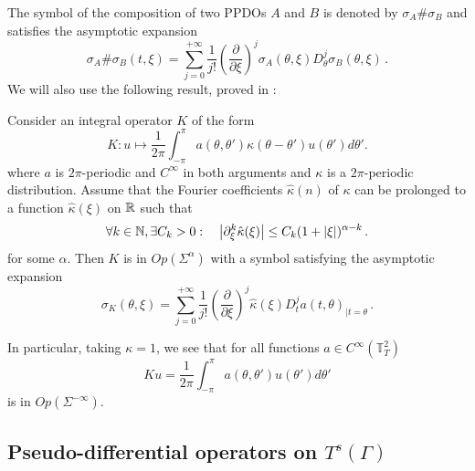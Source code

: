 \documentclass[a4paper]{article}
\begin{document}
The symbol of the composition of two PPDOs $A$ and $B$ is denoted by $\sigma_A \# \sigma_B$ and satisfies the asymptotic expansion
\begin{equation}
	\label{a_diese_b}
	\sigma_A \# \sigma_B(t,\xi) = \sum_{j = 0}^{+\infty}\frac{1}{j!} \left(\frac{\partial}{\partial \xi}\right)^j \sigma_A(\theta,\xi) D_\theta^j \sigma_B(\theta,\xi)\,.
\end{equation}
We will also use the following result, proved in \cite{thrunen1998symbol}:
\begin{The}
	\label{thrunen}
	Consider an integral operator $K$ of the form 
	\[K : u \mapsto \frac{1}{2\pi}\int_{-\pi}^\pi a(\theta,\theta') \kappa(\theta-\theta') u(\theta') d\theta'.\]
	where $a$ is $2\pi$-periodic and $C^{\infty}$ in both arguments and $\kappa$ is a $2\pi$-periodic distribution. Assume that the Fourier coefficients $\hat{\kappa}(n)$ of $\kappa$ can be prolonged to a function $\hat{\kappa}(\xi)$ on $\mathbb{R}$ such that
	\[\forall k \in \mathbb{N},  \exists C_k > 0: \quad \left\lvert \partial^k_\xi \hat{\kappa}(\xi) \right\rvert \leq C_k (1 + \left\lvert \xi \right\rvert)^{\alpha - k}\,.\]
	for some $\alpha$. Then $K$ is in $\textit{Op}(\Sigma^\alpha)$ with a symbol satisfying the asymptotic expansion
	\begin{equation}
	\label{FormuleIntegralOperatorSymbol}
		\sigma_K(\theta, \xi) = \sum_{j = 0}^{+ \infty} \frac{1}{j!} \left(\frac{\partial}{\partial \xi}\right)^j \hat{\kappa}(\xi) D_{t}^ja(t,\theta)_{| t= \theta}\,.
	\end{equation}
\end{The}
\noindent In particular, taking $\kappa = 1$, we see that for all functions $a \in C^{\infty}(\mathbb{T}_T^2)$
\[Ku = \frac{1}{2\pi}\int_{-\pi}^{\pi} a(\theta,\theta') u(\theta') d\theta'\]
is in $Op\left(\Sigma^{-\infty}\right)$.

\subsection{Pseudo-differential operators on $T^s(\Gamma)$}
\end{document}
